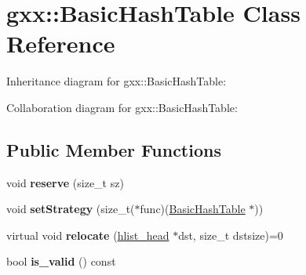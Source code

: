 \hypertarget{classgxx_1_1BasicHashTable}{}\section{gxx\+:\+:Basic\+Hash\+Table Class Reference}
\label{classgxx_1_1BasicHashTable}


Inheritance diagram for gxx\+:\+:Basic\+Hash\+Table\+:


Collaboration diagram for gxx\+:\+:Basic\+Hash\+Table\+:
\subsection*{Public Member Functions}
\begin{DoxyCompactItemize}
\item 
void {\bfseries reserve} (size\+\_\+t sz)\hypertarget{classgxx_1_1BasicHashTable_a5778618b022b2f41b41ffa798db67dc2}{}\label{classgxx_1_1BasicHashTable_a5778618b022b2f41b41ffa798db67dc2}

\item 
void {\bfseries set\+Strategy} (size\+\_\+t($\ast$func)(\hyperlink{classgxx_1_1BasicHashTable}{Basic\+Hash\+Table} $\ast$))\hypertarget{classgxx_1_1BasicHashTable_af96db4e1ec70d7fd04c92fd842318306}{}\label{classgxx_1_1BasicHashTable_af96db4e1ec70d7fd04c92fd842318306}

\item 
virtual void {\bfseries relocate} (\hyperlink{structhlist__head}{hlist\+\_\+head} $\ast$dst, size\+\_\+t dstsize)=0\hypertarget{classgxx_1_1BasicHashTable_aff55d217bdc65f9987d7bdfbefce7965}{}\label{classgxx_1_1BasicHashTable_aff55d217bdc65f9987d7bdfbefce7965}

\item 
bool {\bfseries is\+\_\+valid} () const \hypertarget{classgxx_1_1BasicHashTable_afe34c280a75f30939d00a17b5036eb87}{}\label{classgxx_1_1BasicHashTable_afe34c280a75f30939d00a17b5036eb87}

\end{DoxyCompactItemize}
